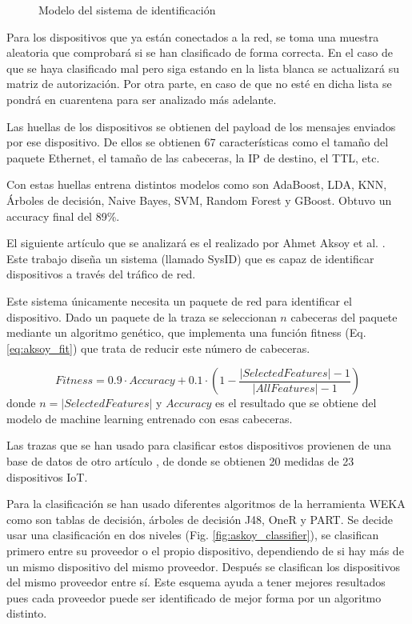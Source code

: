 \begin{figure}
    \centering
    \resizebox{0.6\textwidth}{!}{
        
    }
    \caption{Modelo del sistema de identificación \cite{hamad2019iot}}
    \label{fig:diam_hamad}
\end{figure}

Para los dispositivos que ya están conectados a la red, se toma una muestra aleatoria que comprobará si se han clasificado de forma correcta. En el caso de que se haya clasificado mal pero siga estando en la lista blanca se actualizará su matriz de autorización. Por otra parte, en caso de que no esté en dicha lista se pondrá en cuarentena para ser analizado más adelante.

Las huellas de los dispositivos se obtienen del payload de los mensajes enviados por ese dispositivo. De ellos se obtienen 67 características como el tamaño del paquete Ethernet, el tamaño de las cabeceras, la IP de destino, el TTL, etc.

Con estas huellas entrena distintos modelos como son AdaBoost, LDA, KNN, Árboles de decisión, Naive Bayes, SVM, Random Forest y GBoost. Obtuvo un accuracy final del 89\%.

El siguiente artículo que se analizará es el realizado por Ahmet Aksoy et al. \cite{aksoy2019automated}. Este trabajo diseña un sistema (llamado SysID) que es capaz de identificar dispositivos a través del tráfico de red. 

Este sistema únicamente necesita un paquete de red para identificar el dispositivo. Dado un paquete de la traza se seleccionan $n$ cabeceras del paquete mediante un algoritmo genético, que implementa una función fitness (Eq. \ref{eq:aksoy_fit}) que trata de reducir este número de cabeceras. 

\begin{equation}
    Fitness = 0.9 \cdot Accuracy + 0.1 \cdot \left( 1 - \frac{\lvert SelectedFeatures \rvert - 1}{\lvert AllFeatures \rvert - 1} \right)
    \label{eq:aksoy_fit}
\end{equation}
donde $n = \lvert SelectedFeatures \rvert$ y $Accuracy$ es el resultado que se obtiene del modelo de machine learning entrenado con esas cabeceras.

Las trazas que se han usado para clasificar estos dispositivos provienen de una base de datos de otro artículo \cite{miettinen2017iot}, de donde se obtienen 20 medidas de 23 dispositivos IoT.

Para la clasificación se han usado diferentes algoritmos de la herramienta WEKA \cite{hall2009weka} como son tablas de decisión, árboles de decisión J48, OneR y PART. Se decide usar una clasificación en dos niveles (Fig. \ref{fig:askoy_classifier}), se clasifican primero entre su proveedor o el propio dispositivo, dependiendo de si hay más de un mismo dispositivo del mismo proveedor. Después se clasifican los dispositivos del mismo proveedor entre sí. Este esquema ayuda a tener mejores resultados pues cada proveedor puede ser identificado de mejor forma por un algoritmo distinto.

